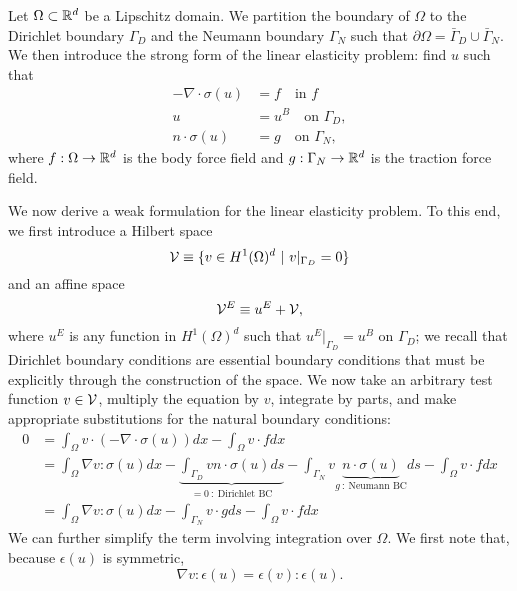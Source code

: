 Let $\Omega \subset \mathbb{R}^d$ be a Lipschitz domain. We partition the boundary of $\Omega$ to the Dirichlet boundary $\Gamma_D$ and the Neumann boundary $\Gamma_N$ such that $\partial \Omega = \bar{\Gamma}_D \cup \bar{\Gamma}_N$. We then introduce the strong form of the linear elasticity problem: find $u$ such that
\begin{align*}
  - \nabla \cdot \sigma(u) &= f \quad \text{in } f \\
  u &= u^B \quad \text{on } \Gamma_{D}, \\
  n \cdot \sigma(u) &= g \quad \text{on } \Gamma_{N},
\end{align*}
where $f: \Omega \to \mathbb{R}^d$ is the body force field and $g: \Gamma_N \to \mathbb{R}^d$ is the traction force field.

We now derive a weak formulation for the linear elasticity problem.  To this end, we first introduce a Hilbert space
\begin{equation}
  \calV \equiv \{ v \in H^1(\Omega)^d \ | \ v|_{\Gamma_D} = 0 \}
  \label{eq:le_calV}
\end{equation}
and an affine space
\begin{equation*}
  \mathcal{V}^E \equiv u^E + \mathcal{V},
\end{equation*}
where $u^E$ is any function in $H^1(\Omega)^d$ such that $u^E|_{\Gamma_D} = u^B$ on $\Gamma_D$; we recall that Dirichlet boundary conditions are essential boundary conditions that must be explicitly through the construction of the space.  We now take an arbitrary test function $v \in \mathcal{V}$, multiply the equation by $v$, integrate by parts, and make appropriate substitutions for the natural boundary conditions: 
\begin{align*}
  0 &= 
  \int_{\Omega} v \cdot (-\nabla \cdot \sigma(u) ) dx - \int_{\Omega} v \cdot f dx \\
  &=
  \int_{\Omega} \nabla v : \sigma (u) dx - \underbrace{ \int_{\Gamma_D} v n \cdot \sigma(u) ds}_{= 0 \ : \ \text{Dirichlet BC}} - \int_{\Gamma_{N}} v \underbrace{ n \cdot \sigma(u)}_{g \ : \ \text{Neumann BC}} ds - \int_{\Omega} v \cdot f dx \\
  &=
  \int_{\Omega} \nabla v : \sigma (u) dx - \int_{\Gamma_N} v \cdot g ds - \int_{\Omega} v \cdot f dx 
\end{align*}
We can further simplify the term involving integration over $\Omega$.  We first note that, because $\epsilon(u)$ is symmetric,
\begin{equation*}
  \nabla v : \epsilon(u) = \epsilon(v) : \epsilon(u) .
\end{equation*}
